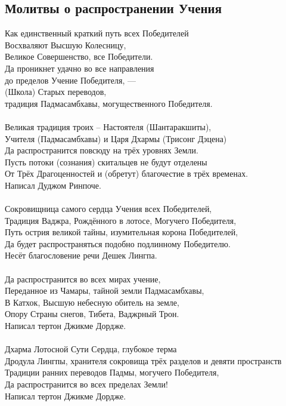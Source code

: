 \subsection{Молитвы о распространении Учения}

Как единственный краткий путь всех Победителей\\
Восхваляют Высшую Колесницу, \\ \indent Великое Совершенство, все Победители.\\
Да проникнет удачно во все направления \\ \indent до пределов Учение Победителя, —\\
(Школа) Старых переводов, \\ \indent традиция Падмасамбхавы, могущественного Победителя.\\
\\
Великая традиция троих – Настоятеля (Шантаракшиты),\\
Учителя (Падмасамбхавы) и Царя Дхармы (Трисонг Дэцена)\\
Да распространится повсюду на трёх уровнях Земли.\\
Пусть потоки (сознания) скитальцев не будут отделены\\
От Трёх Драгоценностей и (обретут) благочестие в трёх временах.\\
\scriptsize
Написал Дуджом Ринпоче.\\
\normalsize
\\
Сокровищница самого сердца Учения всех Победителей,\\
Традиция Ваджра, Рождённого в лотосе, Могучего Победителя,\\
Путь острия великой тайны, изумительная корона Победителей,\\
Да будет распространяться подобно подлинному Победителю.\\
\scriptsize
Несёт благословение речи Дешек Лингпа.\\
\normalsize
\\
Да распространится во всех мирах учение,\\
Переданное из Чамары, тайной земли Падмасамбхавы,\\
В Катхок, Высшую небесную обитель на земле,\\
Опору Страны снегов, Тибета, Ваджрный Трон.\\
\scriptsize
Написал тертон Джикме Дордже.\\
\normalsize
\\
Дхарма Лотосной Сути Сердца, глубокое терма\\
Дродула Лингпы, хранителя сокровища трёх разделов и девяти пространств\\
Традиции ранних переводов Падмы, могучего Победителя,\\
Да распространится во всех пределах Земли!\\
\scriptsize
Написал тертон Джикме Дордже.\\
\normalsize
\\

